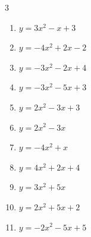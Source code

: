 \begin{multicols}{3}
\begin{enumerate}
  \item $\displaystyle y=3x^{2}-x+3$


\columnbreak %

  \item $\displaystyle y=-4x^{2}+2x-2$


  \item $\displaystyle y=-3x^{2}-2x+4$


  \item $\displaystyle y=-3x^{2}-5x+3$


  \item $\displaystyle y=2x^{2}-3x+3$


  \item $\displaystyle y=2x^{2}-3x$


\columnbreak %

\resetques

  \item $\displaystyle y=-4x^{2}+x$


  \item $\displaystyle y=4x^{2}+2x+4$


  \item $\displaystyle y=3x^{2}+5x$


  \item $\displaystyle y=2x^{2}+5x+2$


  \item $\displaystyle y=-2x^{2}-5x+5$


\end{enumerate}
\end{multicols}
